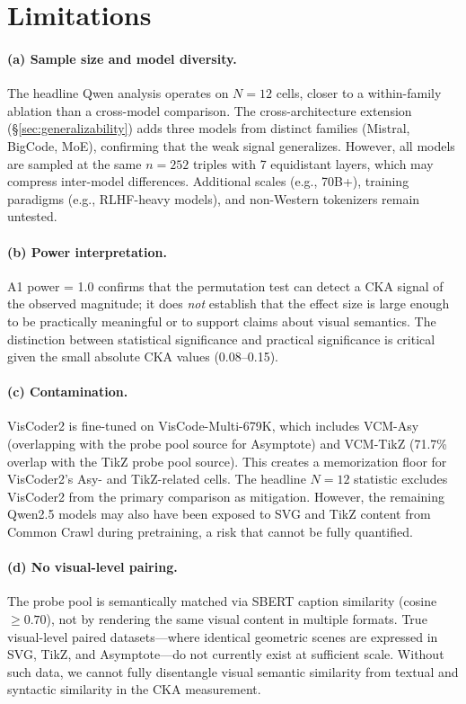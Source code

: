 
\section{Limitations}
\label{sec:limitations}

\paragraph{(a) Sample size and model diversity.}
The headline Qwen analysis operates on $N{=}12$ cells, closer to a within-family ablation than a cross-model comparison.
The cross-architecture extension (\S\ref{sec:generalizability}) adds three models from distinct families (Mistral, BigCode, MoE), confirming that the weak signal generalizes.
However, all models are sampled at the same $n{=}252$ triples with 7 equidistant layers, which may compress inter-model differences.
Additional scales (e.g., 70B+), training paradigms (e.g., RLHF-heavy models), and non-Western tokenizers remain untested.

\paragraph{(b) Power interpretation.}
A1 power = 1.0 confirms that the permutation test can detect a CKA signal of the observed magnitude; it does \emph{not} establish that the effect size is large enough to be practically meaningful or to support claims about visual semantics.
The distinction between statistical significance and practical significance is critical given the small absolute CKA values (0.08--0.15).

\paragraph{(c) Contamination.}
VisCoder2 is fine-tuned on VisCode-Multi-679K, which includes VCM-Asy (overlapping with the probe pool source for Asymptote) and VCM-TikZ (71.7\% overlap with the TikZ probe pool source).
This creates a memorization floor for VisCoder2's Asy- and TikZ-related cells.
The headline $N{=}12$ statistic excludes VisCoder2 from the primary comparison as mitigation.
However, the remaining Qwen2.5 models may also have been exposed to SVG and TikZ content from Common Crawl during pretraining, a risk that cannot be fully quantified.

\paragraph{(d) No visual-level pairing.}
The probe pool is semantically matched via SBERT caption similarity (cosine $\geq 0.70$), not by rendering the same visual content in multiple formats.
True visual-level paired datasets---where identical geometric scenes are expressed in SVG, TikZ, and Asymptote---do not currently exist at sufficient scale.
Without such data, we cannot fully disentangle visual semantic similarity from textual and syntactic similarity in the CKA measurement.

